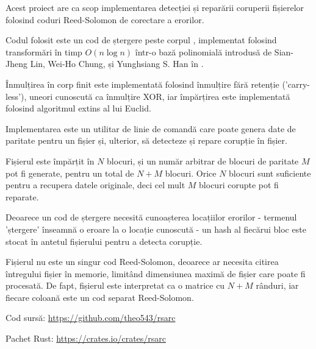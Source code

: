 \begin{abstractpage}

\begin{rezumat}

\indent

Acest proiect are ca scop implementarea detecției și reparării coruperii fișierelor folosind coduri Reed-Solomon de corectare a erorilor.

Codul folosit este un cod de ștergere peste corpul , implementat folosind transformări în timp $O(n \log n)$ într-o bază polinomială introdusă de Sian-Jheng Lin, Wei-Ho Chung, și Yunghsiang S. Han în \cite{novel-poly}.

Înmulțirea în corp finit este implementată folosind înmulțire fără retenție ('carry-less'), uneori cunoscută ca înmulțire XOR, iar împărțirea este implementată folosind algoritmul extins al lui Euclid.

Implementarea este un utilitar de linie de comandă care poate genera date de paritate pentru un fișier și, ulterior, să detecteze și repare corupție în fișier.

Fișierul este împărțit în $N$ blocuri, și un număr arbitrar de blocuri de paritate $M$ pot fi generate, pentru un total de $N + M$ blocuri.
Orice $N$ blocuri sunt suficiente pentru a recupera datele originale, deci cel mult $M$ blocuri corupte pot fi reparate.

Deoarece un cod de ștergere necesită cunoașterea locațiilor erorilor - termenul 'ștergere' înseamnă o eroare la o locație cunoscută - un hash al fiecărui bloc este stocat în antetul fișierului pentru a detecta corupție.

Fișierul nu este un singur cod Reed-Solomon, deoarece ar necesita citirea întregului fișier în memorie, limitând dimensiunea maximă de fișier care poate fi procesată.
De fapt, fișierul este interpretat ca o matrice cu $N + M$ rânduri, iar fiecare coloană este un cod separat Reed-Solomon.

\vspace*{\fill}
\begin{center}Cod sursă: \url{https://github.com/theo543/rsarc}\end{center}
\begin{center}Pachet Rust: \url{https://crates.io/crates/rsarc}\end{center}

\end{rezumat}

\end{abstractpage}
